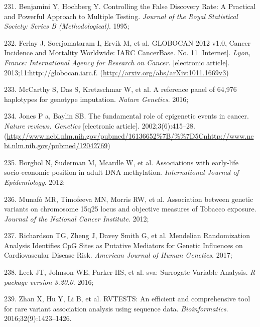 \documentclass[11pt,twoside]{bristolthesis}
\newenvironment{cslreferences}%
  {}%
  {\par}
\begin{document}
\begin{cslreferences}
\leavevmode\hypertarget{ref-Benjamini1995}{}%
231. Benjamini Y, Hochberg Y. Controlling the False Discovery Rate: A Practical and Powerful Approach to Multiple Testing. \emph{Journal of the Royal Statistical Society: Series B (Methodological)}. 1995;

\leavevmode\hypertarget{ref-Ferlay2013}{}%
232. Ferlay J, Soerjomataram I, Ervik M, et al. GLOBOCAN 2012 v1.0, Cancer Incidence and Mortality Worldwide: IARC CancerBase. No. 11 {[}Internet{]}. \emph{Lyon, France: International Agency for Research on Cancer.} {[}electronic article{]}. 2013;11:http://globocan.iarc.f. (\url{http://arxiv.org/abs/arXiv:1011.1669v3})

\leavevmode\hypertarget{ref-McCarthy2016}{}%
233. McCarthy S, Das S, Kretzschmar W, et al. A reference panel of 64,976 haplotypes for genotype imputation. \emph{Nature Genetics}. 2016;

\leavevmode\hypertarget{ref-Jones2002}{}%
234. Jones P a, Baylin SB. The fundamental role of epigenetic events in cancer. \emph{Nature reviews. Genetics} {[}electronic article{]}. 2002;3(6):415--28. (\url{http://www.ncbi.nlm.nih.gov/pubmed/16136652\%7B/\%\%7D5Cnhttp://www.ncbi.nlm.nih.gov/pubmed/12042769})

\leavevmode\hypertarget{ref-Borghol2012}{}%
235. Borghol N, Suderman M, Mcardle W, et al. Associations with early-life socio-economic position in adult DNA methylation. \emph{International Journal of Epidemiology}. 2012;

\leavevmode\hypertarget{ref-Munafo2012}{}%
236. Munafò MR, Timofeeva MN, Morris RW, et al. Association between genetic variants on chromosome 15q25 locus and objective measures of Tobacco exposure. \emph{Journal of the National Cancer Institute}. 2012;

\leavevmode\hypertarget{ref-Richardson2017}{}%
237. Richardson TG, Zheng J, Davey Smith G, et al. Mendelian Randomization Analysis Identifies CpG Sites as Putative Mediators for Genetic Influences on Cardiovascular Disease Risk. \emph{American Journal of Human Genetics}. 2017;

\leavevmode\hypertarget{ref-Leek2016}{}%
238. Leek JT, Johnson WE, Parker HS, et al. sva: Surrogate Variable Analysis. \emph{R package version 3.20.0.} 2016;

\leavevmode\hypertarget{ref-Zhan2016}{}%
239. Zhan X, Hu Y, Li B, et al. RVTESTS: An efficient and comprehensive tool for rare variant association analysis using sequence data. \emph{Bioinformatics}. 2016;32(9):1423--1426.


\end{cslreferences}
\end{document}
